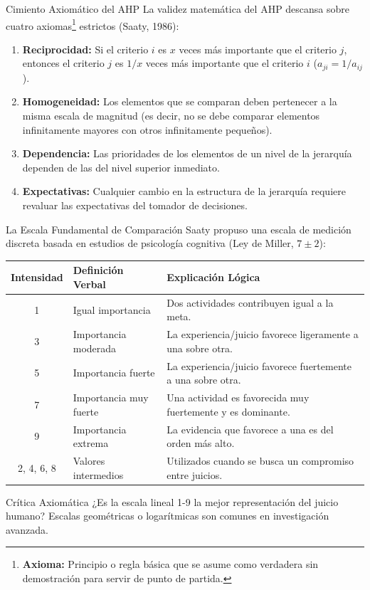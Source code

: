 \documentclass[aspectratio=169, 10pt]{beamer}
\begin{document}
\begin{frame}{Cimiento Axiomático del AHP}
    La validez matemática del AHP descansa sobre cuatro axiomas\footnote{\textbf{Axioma:} Principio o regla básica que se asume como verdadera sin demostración para servir de punto de partida.} estrictos (Saaty, 1986):
    \begin{enumerate}
        \item \textbf{Reciprocidad:} Si el criterio $i$ es $x$ veces más importante que el criterio $j$, entonces el criterio $j$ es $1/x$ veces más importante que el criterio $i$ ($a_{ji} = 1/a_{ij}$).
        \item \textbf{Homogeneidad:} Los elementos que se comparan deben pertenecer a la misma escala de magnitud (es decir, no se debe comparar elementos infinitamente mayores con otros infinitamente pequeños).
        \item \textbf{Dependencia:} Las prioridades de los elementos de un nivel de la jerarquía dependen de las del nivel superior inmediato.
        \item \textbf{Expectativas:} Cualquier cambio en la estructura de la jerarquía requiere revaluar las expectativas del tomador de decisiones.
    \end{enumerate}
\end{frame}

\begin{frame}{La Escala Fundamental de Comparación}
    Saaty propuso una escala de medición discreta basada en estudios de psicología cognitiva (Ley de Miller, $7 \pm 2$):
    \begin{center}
        \scriptsize
        \begin{tabular}{clp{7.5cm}}
            \toprule
            \textbf{Intensidad} & \textbf{Definición Verbal} & \textbf{Explicación Lógica} \\
            \midrule
            1 & Igual importancia & Dos actividades contribuyen igual a la meta. \\
            3 & Importancia moderada & La experiencia/juicio favorece ligeramente a una sobre otra. \\
            5 & Importancia fuerte & La experiencia/juicio favorece fuertemente a una sobre otra. \\
            7 & Importancia muy fuerte & Una actividad es favorecida muy fuertemente y es dominante. \\
            9 & Importancia extrema & La evidencia que favorece a una es del orden más alto. \\
            2, 4, 6, 8 & Valores intermedios & Utilizados cuando se busca un compromiso entre juicios. \\
            \bottomrule
        \end{tabular}
    \end{center}
    \begin{alertblock}{Crítica Axiomática}
        \scriptsize
        ¿Es la escala lineal 1-9 la mejor representación del juicio humano? Escalas geométricas o logarítmicas son comunes en investigación avanzada.
    \end{alertblock}
\end{frame}
\end{document}

